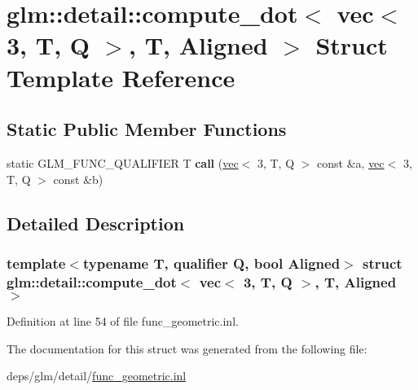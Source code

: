 \hypertarget{structglm_1_1detail_1_1compute__dot_3_01vec_3_013_00_01T_00_01Q_01_4_00_01T_00_01Aligned_01_4}{}\section{glm\+:\+:detail\+:\+:compute\+\_\+dot$<$ vec$<$ 3, T, Q $>$, T, Aligned $>$ Struct Template Reference}
\label{structglm_1_1detail_1_1compute__dot_3_01vec_3_013_00_01T_00_01Q_01_4_00_01T_00_01Aligned_01_4}
\subsection*{Static Public Member Functions}
\begin{DoxyCompactItemize}
\item 
\mbox{\label{structglm_1_1detail_1_1compute__dot_3_01vec_3_013_00_01T_00_01Q_01_4_00_01T_00_01Aligned_01_4_a1fb8b9e9e28e67f92f0288e723f73248}} 
static G\+L\+M\+\_\+\+F\+U\+N\+C\+\_\+\+Q\+U\+A\+L\+I\+F\+I\+ER T {\bfseries call} (\hyperlink{structglm_1_1vec}{vec}$<$ 3, T, Q $>$ const \&a, \hyperlink{structglm_1_1vec}{vec}$<$ 3, T, Q $>$ const \&b)
\end{DoxyCompactItemize}


\subsection{Detailed Description}
\subsubsection*{template$<$typename T, qualifier Q, bool Aligned$>$\newline
struct glm\+::detail\+::compute\+\_\+dot$<$ vec$<$ 3, T, Q $>$, T, Aligned $>$}



Definition at line 54 of file func\+\_\+geometric.\+inl.



The documentation for this struct was generated from the following file\+:\begin{DoxyCompactItemize}
\item 
deps/glm/detail/\hyperlink{func__geometric_8inl}{func\+\_\+geometric.\+inl}\end{DoxyCompactItemize}

